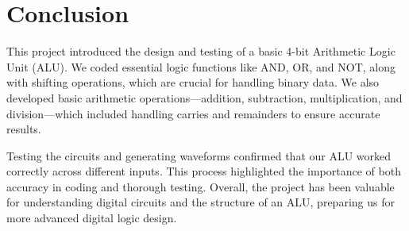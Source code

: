 \documentclass[12pt]{article}
\begin{document}
\section{Conclusion}

This project introduced the design and testing of a basic 4-bit Arithmetic Logic Unit (ALU). We coded essential logic functions like AND, OR, and NOT, along with shifting operations, which are crucial for handling binary data. We also developed basic arithmetic operations—addition, subtraction, multiplication, and division—which included handling carries and remainders to ensure accurate results.

Testing the circuits and generating waveforms confirmed that our ALU worked correctly across different inputs. This process highlighted the importance of both accuracy in coding and thorough testing. Overall, the project has been valuable for understanding digital circuits and the structure of an ALU, preparing us for more advanced digital logic design.
\end{document}
